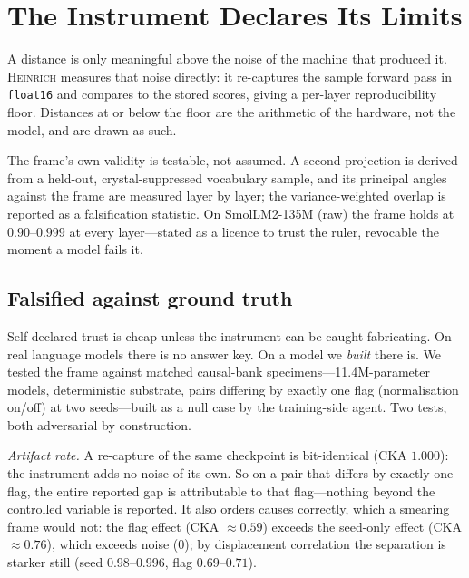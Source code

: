 \documentclass[11pt,a4paper]{article}
\newcommand{\heinrich}{\textsc{Heinrich}}
\begin{document}
\section{The Instrument Declares Its Limits}

A distance is only meaningful above the noise of the machine that produced it.
\heinrich{} measures that noise directly: it re-captures the sample forward pass in
\texttt{float16} and compares to the stored scores, giving a per-layer reproducibility
floor. Distances at or below the floor are the arithmetic of the hardware, not the
model, and are drawn as such.

The frame's own validity is testable, not assumed. A second projection is derived from
a held-out, crystal-suppressed vocabulary sample, and its principal angles against the
frame are measured layer by layer; the variance-weighted overlap is reported as a
falsification statistic. On SmolLM2-135M (raw) the frame holds at $0.90$--$0.999$ at
every layer---stated as a licence to trust the ruler, revocable the moment a model
fails it.


\subsection{Falsified against ground truth}

Self-declared trust is cheap unless the instrument can be caught fabricating. On
real language models there is no answer key. On a model we \emph{built} there is.
We tested the frame against matched causal-bank specimens---11.4M-parameter
models, deterministic substrate, pairs differing by exactly one flag
(normalisation on/off) at two seeds---built as a null case by the training-side
agent. Two tests, both adversarial by construction.

\emph{Artifact rate.} A re-capture of the same checkpoint is bit-identical (CKA
$1.000$): the instrument adds no noise of its own. So on a pair that differs by
exactly one flag, the entire reported gap is attributable to that flag---nothing
beyond the controlled variable is reported. It also orders causes correctly, which
a smearing frame would not: the flag effect (CKA $\approx0.59$) exceeds the
seed-only effect (CKA $\approx0.76$), which exceeds noise ($0$); by displacement
correlation the separation is starker still (seed $0.98$--$0.996$, flag
$0.69$--$0.71$).
\end{document}

